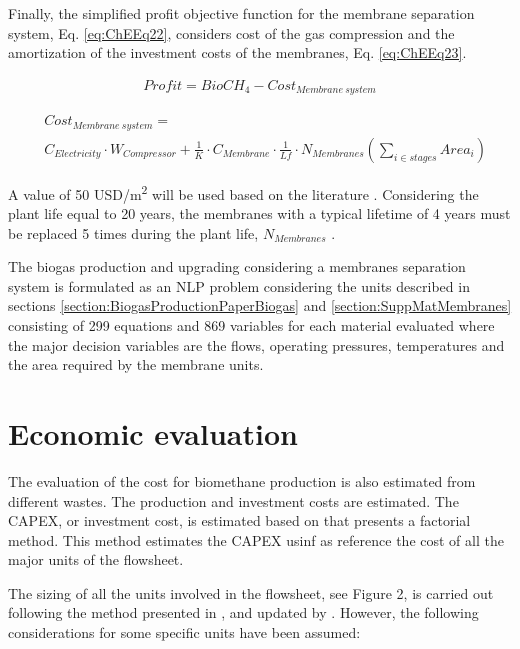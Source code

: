 \begin{refsection}[referencesCh7]
Finally, the simplified profit objective function for the membrane separation system, Eq. \ref{eq:ChEEq22}, considers cost of the gas compression and the amortization of the investment costs of the membranes, Eq. \ref{eq:ChEEq23}. 

\begin{align}
Profit = BioCH_{4} - Cost_{{{Membrane \ system}}} \label{eq:ChEEq22}
\end{align}

\begin{align}
& Cost_{{{Membrane \ system}}} = \label{eq:ChEEq23} \\
& {{{C}}_{Electricity}}\cdot W_{Compressor} + \frac{1}{K}\cdot{C_{Membrane}}\cdot\frac{1}{{Lf}}\cdot{N_{Membranes}}\left( \sum\limits_{i \in stages} {Are{a_i}} \right)  \nonumber
\end{align}

A value of 50 USD/m\textsuperscript{2} will be used based on the literature \citep{kim2017optimization}. Considering the plant life equal to 20 years, the membranes with a typical lifetime of 4 years must be replaced 5 times during the plant life, $N_{Membranes}$ \citep{scholz2015structural}.

The biogas production and upgrading considering a membranes separation system is formulated as an NLP problem considering the units described in sections \ref{section:BiogasProductionPaperBiogas} and \ref{section:SuppMatMembranes} consisting of 299 equations and 869 variables for each material evaluated where the major decision variables are the flows, operating pressures, temperatures and the area required by the membrane units.

\section{Economic evaluation} \label{section:SuppMatPaperCO2Section3}
The evaluation of the cost for biomethane production is also estimated from different wastes. The production and investment costs are estimated. The CAPEX, or investment cost, is estimated based on \citet{towler2009chemical} that presents a factorial method. This method estimates the CAPEX usinf as reference the cost of all the major units of the flowsheet. 

The sizing of all the units involved in the flowsheet, see Figure 2, is carried out following the method presented in \citet{martin2011energy}, and updated by \citet{almena2016technoeconomic}. However, the following considerations for some specific units have been assumed:


\end{refsection}
